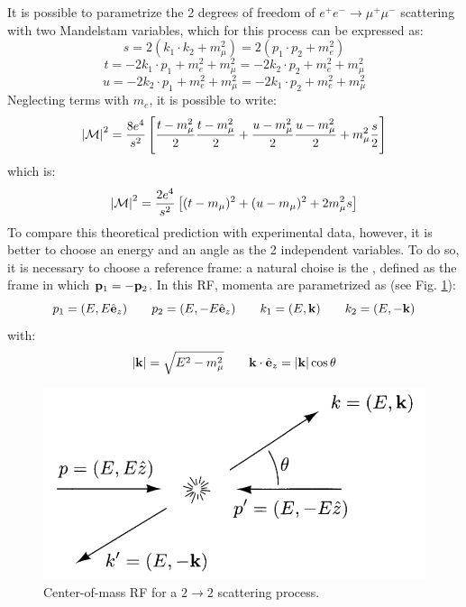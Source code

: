 It is possible to parametrize the 2 degrees of freedom of $ e^+e^- \rightarrow \mu^+\mu^- $ scattering with two Mandelstam variables, which for this process can be expressed as:
\begin{equation*}
  s = 2 (k_1 \cdot k_2 + m_\mu^2) = 2 (p_1 \cdot p_2 + m_e^2)
\end{equation*}
\begin{equation*}
  t = -2 k_1 \cdot p_1 + m_e^2 + m_\mu^2 = -2 k_2 \cdot p_2 + m_e^2 + m_\mu^2
\end{equation*}
\begin{equation*}
  u = -2 k_2 \cdot p_1 + m_e^2 + m_\mu^2 = -2 k_1 \cdot p_2 + m_e^2 + m_\mu^2
\end{equation*}
Neglecting terms with $ m_e $, it is possible to write:
\begin{equation*}
  \left\lvert\mathcal{M}\right\rvert^2 = \frac{8e^4}{s^2} \left[ \frac{t - m_\mu^2}{2} \frac{t - m_\mu^2}{2} + \frac{u - m_\mu^2}{2} \frac{u - m_\mu^2}{2} + m_\mu^2 \frac{s}{2} \right]
\end{equation*}
which is:
\begin{equation}
  \left\lvert\mathcal{M}\right\rvert^2 = \frac{2e^4}{s^2} \left[ (t - m_\mu)^2 + (u - m_\mu)^2 + 2m_\mu^2 s \right]
  \label{eq:mat-el-mand}
\end{equation}
To compare this theoretical prediction with experimental data, however, it is better to choose an energy and an angle as the 2 independent variables. To do so, it is necessary to choose a reference frame: a natural choise is the , defined as the frame in which $ \mathbf{p}_1 = - \mathbf{p}_2 $. In this RF, momenta are parametrized as (see Fig. \ref{com-rf}):
\begin{equation*}
  p_1 = (E, E \hat{\mathbf{e}}_z) \qquad p_2 = (E, -E \hat{\mathbf{e}}_z) \qquad k_1 = (E, \mathbf{k}) \qquad k_2 = (E, -\mathbf{k})
\end{equation*}
with:
\begin{equation*}
  \left\lvert\mathbf{k}\right\rvert = \sqrt{E^2 - m_\mu^2} \qquad \mathbf{k} \cdot \hat{\mathbf{e}}_z = \left\lvert\mathbf{k}\right\rvert \cos \theta
\end{equation*}

\begin{figure}
  \centering
  \includegraphics[width = 0.50 \textwidth]{images/com-rf.png}
  \caption{Center-of-mass RF for a $ 2 \rightarrow 2 $ scattering process.}
  \label{com-rf}
\end{figure}

